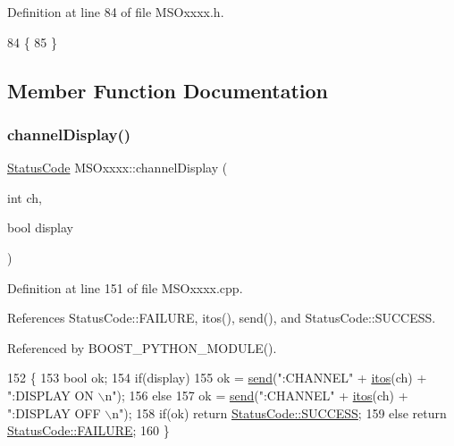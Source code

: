 Definition at line 84 of file M\+S\+Oxxxx.\+h.


\begin{DoxyCode}
84             \{
85   \}
\end{DoxyCode}


\subsection{Member Function Documentation}
\mbox{\label{classMSOxxxx_a4cb8e745f172b7a30953ec87923c8c76}} 
\subsubsection{\texorpdfstring{channel\+Display()}{channelDisplay()}}
{\footnotesize\ttfamily \hyperlink{classStatusCode}{Status\+Code} M\+S\+Oxxxx\+::channel\+Display (\begin{DoxyParamCaption}\item[{int}]{ch,  }\item[{bool}]{display }\end{DoxyParamCaption})}



Definition at line 151 of file M\+S\+Oxxxx.\+cpp.



References Status\+Code\+::\+F\+A\+I\+L\+U\+RE, itos(), send(), and Status\+Code\+::\+S\+U\+C\+C\+E\+SS.



Referenced by B\+O\+O\+S\+T\+\_\+\+P\+Y\+T\+H\+O\+N\+\_\+\+M\+O\+D\+U\+L\+E().


\begin{DoxyCode}
152 \{
153     \textcolor{keywordtype}{bool} ok;
154     \textcolor{keywordflow}{if}(display)     
155         ok = \hyperlink{classMSOxxxx_ae77668a1ae4ccb74e0ed5f2485dfdebf}{send}(\textcolor{stringliteral}{":CHANNEL"} + \hyperlink{Tools_8h_af330027dbdafb9a30768b3613c553e60}{itos}(ch) + \textcolor{stringliteral}{":DISPLAY ON \(\backslash\)n"});
156     \textcolor{keywordflow}{else}
157         ok = \hyperlink{classMSOxxxx_ae77668a1ae4ccb74e0ed5f2485dfdebf}{send}(\textcolor{stringliteral}{":CHANNEL"} + \hyperlink{Tools_8h_af330027dbdafb9a30768b3613c553e60}{itos}(ch) + \textcolor{stringliteral}{":DISPLAY OFF \(\backslash\)n"});
158     \textcolor{keywordflow}{if}(ok)  \textcolor{keywordflow}{return} \hyperlink{classStatusCode_a6f565cbeadc76d14c72f047e5e85eb4badd0da38d3ba0d922efd1f4619bc37ad8}{StatusCode::SUCCESS};
159     \textcolor{keywordflow}{else}        \textcolor{keywordflow}{return} \hyperlink{classStatusCode_a6f565cbeadc76d14c72f047e5e85eb4ba3da73d4c469762eb9d3c960368252b26}{StatusCode::FAILURE};  
160 \}
\end{DoxyCode}
\mbox{\label{classMSOxxxx_af9851b9ce16b0e88e8691c8174ba54f0}} 
